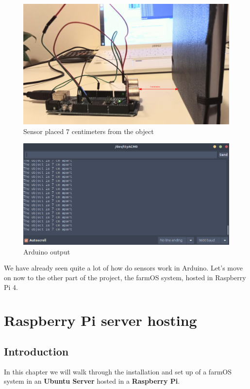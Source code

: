 \begin{figure}[H]
    \centering
    \includegraphics[width=1\textwidth]{fig/ultrasonic7cm.png}
    \caption{Sensor placed 7 centimeters from the object}
    \label{fig:ultrasonic7cm}
\end{figure}

\begin{figure}[H]
    \centering
    \includegraphics[width=1\textwidth]{fig/arduino7cm.png}
    \caption{Arduino output}
    \label{fig:arduino7cm}
\end{figure}


\vspace{7mm}
We have already seen quite a lot of how do sensors work in Arduino. Let's move on now to the other part of the project, the farmOS system, hosted in Raspberry Pi 4.

\newpage
\section{Raspberry Pi server hosting}

\subsection{Introduction}
In this chapter we will walk through the installation and set up of a farmOS system in an \textbf{Ubuntu Server} hosted in a \textbf{Raspberry Pi}.

